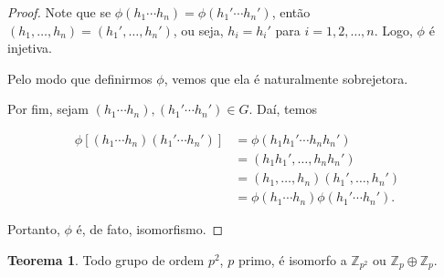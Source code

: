 \documentclass[a4paper,portuguese,11pt,twoside, leqno]{book}
\theoremstyle{definition}
\newtheorem{theorem}{Teorema}[section]
\begin{document}
\begin{proof}
		\par\vspace{0.3cm} Note que se $\phi(h_1\cdots h_n) = \phi(h_1'\cdots h_n')$, então $(h_1, \dots, h_n) = (h_1', \dots, h_n')$, ou seja, $h_i = h_i'$ para $i = 1, 2, \dots, n$. Logo, $\phi$ é injetiva.
		
		\par\vspace{0.3cm} Pelo modo que definirmos $\phi$, vemos que ela é naturalmente sobrejetora.
		
		\par\vspace{0.3cm} Por fim, sejam $(h_1\cdots h_n), (h_1'\cdots h_n')\in G$. Daí, temos
		
		\begin{align*}
		\phi[ (h_1\cdots h_n)(h_1'\cdots h_n') ] &= \phi (h_1h_1'\cdots h_nh_n') \\ &= (h_1h_1', \dots, h_nh_n') \\ &= (h_1, \dots, h_n)(h_1', \dots, h_n') \\ &= \phi(h_1\cdots h_n)\phi(h_1'\cdots h_n').
		\end{align*} 
		
		\par\vspace{0.3cm} Portanto, $\phi$ é, de fato, isomorfismo.
		
	\end{proof}
	
	
	\begin{theorem}
		\label{classificacao grupos de ordem p2}
		Todo grupo de ordem $p^2$, $p$ primo, é isomorfo a $\mathbb{Z}_{p^2}$ ou $\mathbb{Z}_p\oplus\mathbb{Z}_p$.
	\end{theorem}
	
\end{document}
